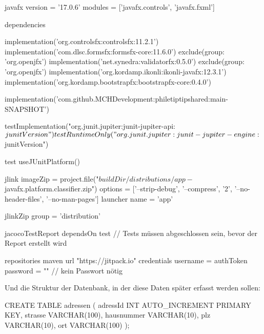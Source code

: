 javafx {
  version = '17.0.6'
  modules = ['javafx.controls', 'javafx.fxml']
}

dependencies {
  implementation('org.controlsfx:controlsfx:11.2.1')
  implementation('com.dlsc.formsfx:formsfx-core:11.6.0') {
    exclude(group: 'org.openjfx')
  }
  implementation('net.synedra:validatorfx:0.5.0') {
    exclude(group: 'org.openjfx')
  }
  implementation('org.kordamp.ikonli:ikonli-javafx:12.3.1')
  implementation('org.kordamp.bootstrapfx:bootstrapfx-core:0.4.0')

  implementation('com.github.MCHDevelopment:philetiptipshared:main-SNAPSHOT')

  testImplementation("org.junit.jupiter:junit-jupiter-api:${junitVersion}")
  testRuntimeOnly("org.junit.jupiter:junit-jupiter-engine:${junitVersion}")
}

test {
useJUnitPlatform()}

jlink {
  imageZip = project.file("${buildDir}/distributions/app-${javafx.platform.classifier}.zip")
  options = ['--strip-debug', '--compress', '2', '--no-header-files', '--no-man-pages']
  launcher {
    name = 'app'
  }
}

jlinkZip {
  group = 'distribution'
}

jacocoTestReport {
  dependsOn test // Tests müssen abgeschlossen sein, bevor der Report erstellt wird
}

repositories {
  maven {
    url "https://jitpack.io"
    credentials {
      username = authToken
      password = "" // kein Passwort nötig
    }
  }
}

Und die Struktur der Datenbank, in der diese Daten später erfasst werden sollen:

CREATE TABLE adressen (
    adressId INT AUTO_INCREMENT PRIMARY KEY,
    strasse VARCHAR(100),
    hausnummer VARCHAR(10),
    plz VARCHAR(10),
    ort VARCHAR(100)
);